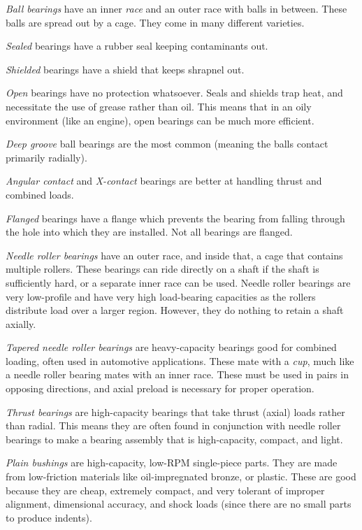 \documentclass[10pt,letterpaper]{book}
\begin{document}
	\begin{asparaenum}[a)]
		\item \textit{Ball bearings} have an inner \textit{race} and an outer race with balls in between. These balls are spread out by a cage. They come in many different varieties.
		\begin{asparaitem}[\ \ \ ]
			\item \textit{Sealed} bearings have a rubber seal keeping contaminants out.
			\item \textit{Shielded} bearings have a shield that keeps shrapnel out.
			\item \textit{Open} bearings have no protection whatsoever. Seals and shields trap heat, and necessitate the use of grease rather than oil. This means that in an oily environment (like an engine), open bearings can be much more efficient.
			
			\item \textit{Deep groove} ball bearings are the most common (meaning the balls contact primarily radially).
			\item \textit{Angular contact} and \textit{X-contact} bearings are better at handling thrust and combined loads.
			
			\item \textit{Flanged} bearings have a flange which prevents the bearing from falling through the hole into which they are installed. Not all bearings are flanged.
		\end{asparaitem}
		\item \textit{Needle roller bearings} have an outer race, and inside that, a cage that contains multiple rollers. These bearings can ride directly on a shaft if the shaft is sufficiently hard, or a separate inner race can be used. Needle roller bearings are very low-profile and have very high load-bearing capacities as the rollers distribute load over a larger region. However, they do nothing to retain a shaft axially.
		\item \textit{Tapered needle roller bearings} are heavy-capacity bearings good for combined loading, often used in automotive applications. These mate with a \textit{cup}, much like a needle roller bearing mates with an inner race. These must be used in pairs in opposing directions, and axial preload is necessary for proper operation.
		\item \textit{Thrust bearings} are high-capacity bearings that take thrust (axial) loads rather than radial. This means they are often found in conjunction with needle roller bearings to make a bearing assembly that is high-capacity, compact, and light.
		\item \textit{Plain bushings} are high-capacity, low-RPM single-piece parts. They are made from low-friction materials like oil-impregnated bronze, or plastic. These are good because they are cheap, extremely compact, and very tolerant of improper alignment, dimensional accuracy, and shock loads (since there are no small parts to produce indents).
	\end{asparaenum}
	
\end{document}
